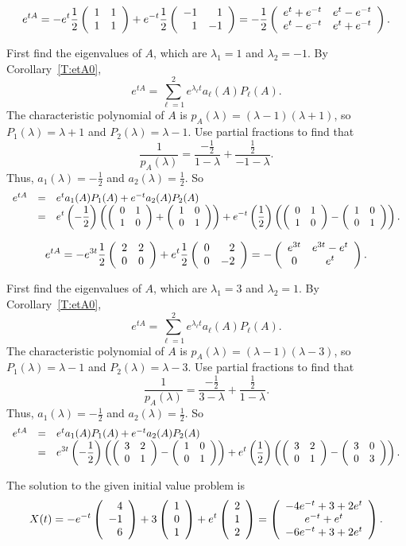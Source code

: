 \documentclass{ximera}
\begin{document}
 \ans
\[
e^{tA} = -e^t\frac{1}{2}\left(\begin{array}{rr} 1 & 1\\ 1 &1\end{array}\right) +
e^{-t}\frac{1}{2}\left(\begin{array}{rr} -1 & 1\\ 1 &-1\end{array}\right)
= -\frac{1}{2}\left(\begin{array}{cc} e^{t} + e^{-t} & e^t - e^{-t}\\ e^t - e^{-t} &e^t + e^{-t}\end{array}\right).
\]

\soln First find the eigenvalues of $A$, which are $\lambda_1 = 1$ and
$\lambda_2 = -1$.  By Corollary~\ref{T:etA0},
\[
e^{tA} = \sum_{\ell = 1}^2 e^{\lambda_\ell t}a_\ell(A)P_\ell(A).
\]
The characteristic polynomial of $A$ is $p_A(\lambda) = (\lambda -
1)(\lambda + 1)$, so $P_1(\lambda) = \lambda + 1$ and $P_2(\lambda) =
\lambda - 1$.  Use partial fractions to find that
\[
\frac{1}{p_A(\lambda)} = \frac{-\frac{1}{2}}{1 - \lambda} + \frac{\frac{1}{2}}
{-1 - \lambda}.
\]
Thus, $a_1(\lambda) = -\frac{1}{2}$ and $a_2(\lambda) = \frac{1}{2}$.  So
\[
\begin{array}{rcl}
e^{tA} & = & e^ta_1(A)P_1(A) + e^{-t}a_2(A)P_2(A) \\
& = & \displaystyle e^t\left(-\frac{1}{2}\right)\left(\left(\begin{array}{rr} 0 & 1\\ 1 &0\end{array}\right) +
\left(\begin{array}{rr} 1 & 0\\ 0 &1\end{array}\right)\right) + e^{-t}\left(\frac{1}{2}\right)
\left(\left(\begin{array}{rr} 0 & 1\\ 1 &0\end{array}\right) - \left(\begin{array}{rr} 1 & 0\\ 0 &1\end{array}\right)\right).
\end{array}
\]

 \ans
\[
e^{tA} = -e^{3t}\frac{1}{2}\left(\begin{array}{rr} 2 & 2\\ 0 &0\end{array}\right) +
e^t\frac{1}{2}\left(\begin{array}{rr} 0 & 2\\ 0 &-2\end{array}\right)
= -\left(\begin{array}{cc} e^{3t} & e^{3t} - e^{t}\\ 0 &e^{t}\end{array}\right).
\]

\soln First find the eigenvalues of $A$, which are $\lambda_1 = 3$ and
$\lambda_2 = 1$.  By Corollary~\ref{T:etA0},
\[
e^{tA} = \sum_{\ell = 1}^2 e^{\lambda_\ell t}a_\ell(A)P_\ell(A).
\]
The characteristic polynomial of $A$ is $p_A(\lambda) = (\lambda -
1)(\lambda - 3)$, so $P_1(\lambda) = \lambda - 1$ and $P_2(\lambda) =
\lambda - 3$.  Use partial fractions to find that
\[
\frac{1}{p_A(\lambda)} = \frac{-\frac{1}{2}}{3 - \lambda} + \frac{\frac{1}{2}}
{1 - \lambda}.
\]
Thus, $a_1(\lambda) = -\frac{1}{2}$ and $a_2(\lambda) = \frac{1}{2}$.  So
\[
\begin{array}{rcl}
e^{tA} & = & e^ta_1(A)P_1(A) + e^{-t}a_2(A)P_2(A) \\
& = & \displaystyle e^{3t}\left(-\frac{1}{2}\right)\left(\left(\begin{array}{rr} 3 & 2\\ 0 &1\end{array}\right) -
\left(\begin{array}{rr} 1 & 0\\ 0 &1\end{array}\right)\right) + e^{t}\left(\frac{1}{2}\right)
\left(\left(\begin{array}{rr} 3 & 2\\ 0 &1\end{array}\right) - \left(\begin{array}{rr} 3 & 0\\ 0 &3\end{array}\right)\right).
\end{array}
\]

 \ans The solution to the given initial value problem is
\[
X(t) = -e^{-t}\left(\begin{array}{r} 4 \\ -1 \\ 6\end{array}\right) +
3\left(\begin{array}{r} 1 \\ 0 \\ 1\end{array}\right) + e^t\left(\begin{array}{r} 2 \\ 1 \\ 2\end{array}\right)
= \left(\begin{array}{c} -4e^{-t} + 3 + 2e^t \\ e^{-t} + e^t \\ -6e^{-t} + 3 + 2e^t\end{array}\right).
\]
\end{document}
